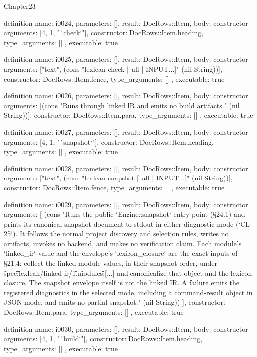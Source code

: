 \begin{lexlean}{Chapter23}
\begin{semanticmodule}
definition{
  name: i0024,
  parameters: [],
  result: DocRows::Item,
  body: constructor{
    arguments: [4, 1, "`check`"],
    constructor: DocRows::Item.heading,
    type_arguments: []
  },
  executable: true
}

definition{
  name: i0025,
  parameters: [],
  result: DocRows::Item,
  body: constructor{
    arguments: ["text", (cons "lexlean check [--all | INPUT...]" (nil String))],
    constructor: DocRows::Item.fence,
    type_arguments: []
  },
  executable: true
}

definition{
  name: i0026,
  parameters: [],
  result: DocRows::Item,
  body: constructor{
    arguments: [(cons "Runs through linked IR and emits no build artifacts." (nil String))],
    constructor: DocRows::Item.para,
    type_arguments: []
  },
  executable: true
}

definition{
  name: i0027,
  parameters: [],
  result: DocRows::Item,
  body: constructor{
    arguments: [4, 1, "`snapshot`"],
    constructor: DocRows::Item.heading,
    type_arguments: []
  },
  executable: true
}

definition{
  name: i0028,
  parameters: [],
  result: DocRows::Item,
  body: constructor{
    arguments: ["text", (cons "lexlean snapshot [--all | INPUT...]" (nil String))],
    constructor: DocRows::Item.fence,
    type_arguments: []
  },
  executable: true
}

definition{
  name: i0029,
  parameters: [],
  result: DocRows::Item,
  body: constructor{
    arguments: [
      (cons "Runs the public `Engine::snapshot` entry point (§24.1) and prints its canonical snapshot document to stdout in either diagnostic mode (`CL-25`). It follows the normal project discovery and selection rules, writes no artifacts, invokes no backend, and makes no verification claim. Each module's `linked_ir` value and the envelope's `lexicon_closure` are the exact inputs of §21.4: collect the linked module values, in their snapshot order, under {\"spec\":\"lexlean/linked-ir/1\",\"modules\":[...]} and canonicalize that object and the lexicon closure. The snapshot envelope itself is not the linked IR. A failure emits the registered diagnostics in the selected mode, including a command-result object in JSON mode, and emits no partial snapshot." (nil String))
    ],
    constructor: DocRows::Item.para,
    type_arguments: []
  },
  executable: true
}

definition{
  name: i0030,
  parameters: [],
  result: DocRows::Item,
  body: constructor{
    arguments: [4, 1, "`build`"],
    constructor: DocRows::Item.heading,
    type_arguments: []
  },
  executable: true
}


\end{semanticmodule}
\end{lexlean}

